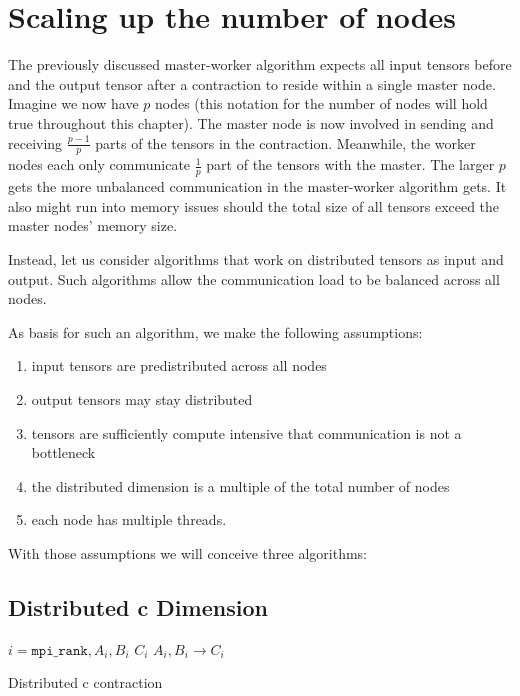 \section{Scaling up the number of nodes}

The previously discussed master-worker algorithm expects all input tensors before and the output tensor after a contraction to reside within a single master node.
Imagine we now have $p$ nodes (this notation for the number of nodes will hold true throughout this chapter).
The master node is now involved in sending and receiving $\frac{p-1}{p}$ parts of the tensors in the contraction.
Meanwhile, the worker nodes each only communicate $\frac{1}{p}$ part of the tensors with the master.
The larger $p$ gets the more unbalanced communication in the master-worker algorithm gets.
It also might run into memory issues should the total size of all tensors exceed the master nodes' memory size.

Instead, let us consider algorithms that work on distributed tensors as input and output.
Such algorithms allow the communication load to be balanced across all nodes.

As basis for such an algorithm, we make the following assumptions:
\begin{enumerate}
    \item input tensors are predistributed across all nodes
    \item output tensors may stay distributed
    \item tensors are sufficiently compute intensive that communication is not a bottleneck
    \item the distributed dimension is a multiple of the total number of nodes
    \item each node has multiple threads.
\end{enumerate}


With those assumptions we will conceive three algorithms:

\subsection{Distributed c Dimension}

\begin{algorithm}[h]
    \begin{algorithmic}
    \Require $i = \texttt{mpi\_rank}, A_i, B_i$
    \Ensure $C_i$
    \State $A_i, B_i \rightarrow C_i$
\end{algorithmic}
\caption{Distributed c contraction}
\label{c_pseudocode}
\end{algorithm}

